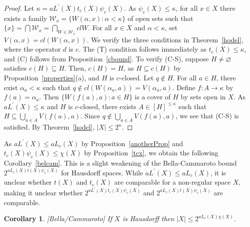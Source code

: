 \documentclass[11pt]{amsart}
\newif\ifdraft\draftfalse
\newtheorem{corollary}[theorem]{Corollary}
\theoremstyle{definition}
\theoremstyle{remark}
\numberwithin{equation}{section}
\begin{document}
\begin{proof}
Let $\kappa=aL^\prime(X)t_c(X)\psi_c(X)$. As $\psi_c(X)\leq\kappa$, for all $x\in X$ there exists a family ${\ensuremath{\mathcal{{W}}}}_x=\{W(\alpha,x):\alpha<\kappa\}$ of open sets such that $\{x\}={\bigcap}{\ensuremath{\mathcal{{W}}}}_x={\bigcap}_{W\in{\ensuremath{\mathcal{{W}}}}_x}clW$. For all $x\in X$ and $\alpha<\kappa$, set $V(\alpha,x)=cl(W(\alpha,x))$. We verify the three conditions in Theorem~\ref{hodel}, where the operator $d$ is $c$. The (T) condition follows immediately as $t_c(X)\leq\kappa$, and (C) follows from Proposition~\ref{cbound}. To verify (C-S), suppose $H\neq{\varnothing}$ satisfies $c(H){\subseteq} H$. Then, $c(H)=H$, as $H{\subseteq} c(H)$ by Proposition~\ref{properties}(a), and $H$ is $c$-closed. Let $q\notin H$. For all $a\in H$, there exist $\alpha_a<\kappa$ such that $q\notin cl(W(\alpha_a,a))=V(\alpha_a,a)$. Define $f:A\to\kappa$ by $f(a)=\alpha_a$. Then $\{W(f(a),a):a\in H\}$ is a cover of $H$ by sets open in $X$. As $aL^\prime(X)\leq\kappa$ and $H$ is $c$-closed, there exists $A\in[H]^{\leq\kappa}$ such that $H{\subseteq}{\bigcup}_{a\in A}V(f(a),a)$. Since $q\notin{\bigcup}_{a\in A}V(f(a),a)$, we see that (C-S) is satisfied. By Theorem~\ref{hodel}, $|X|\leq 2^\kappa$.
\end{proof}

As $aL^\prime(X)\leq aL_c(X)$ by Proposition~\ref{anotherProp} and $t_c(X)\psi_c(X)\leq\chi(X)$ by Proposition~\ref{tcx}, we obtain the following Corollary~\ref{belcam}. This is a slight weakening of the Bella-Cammaroto bound $2^{aL_c(X)t(X)\psi_c(X)}$ for Hausdorff spaces. While $aL^\prime(X)\leq aL_c(X)$, it is unclear whether $t(X)$ and $t_c(X)$ are comparable for a non-regular space $X$, making it unclear whether $2^{aL^\prime(X)t_c(X)\psi_c(X)}$ and $2^{aL_c(X)t(X)\psi_c(X)}$ are comparable.

\begin{corollary}{{\immediate{}}{\ifdraft\hspace{-\lastskip}\vadjust{\vspace{-1mm}\smash{\llap{{\tt {{belcam}}}\hspace{8mm}}}\vspace{1mm}}\fi}}[Bella/Cammaroto]
If $X$ is Hausdorff then $|X|\leq 2^{aL_c(X)\chi(X)}$.
\end{corollary}
\end{document}
